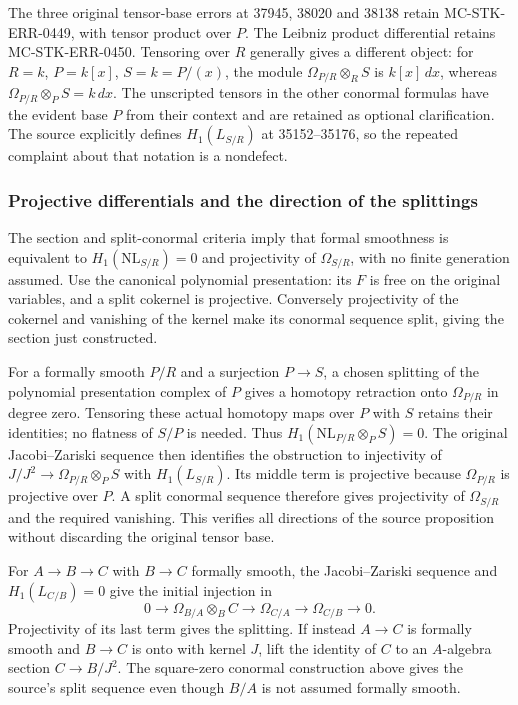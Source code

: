 The three original tensor-base errors at 37945, 38020 and 38138 retain MC-STK-ERR-0449, with tensor product over \(P\). The Leibniz product differential retains MC-STK-ERR-0450. Tensoring over \(R\) generally gives a different object: for \(R=k\), \(P=k[x]\), \(S=k=P/(x)\), the module \(\Omega_{P/R}\otimes_RS\) is \(k[x]\,dx\), whereas \(\Omega_{P/R}\otimes_PS=k\,dx\). The unscripted tensors in the other conormal formulas have the evident base \(P\) from their context and are retained as optional clarification. The source explicitly defines \(H_1(L_{S/R})\) at 35152--35176, so the repeated complaint about that notation is a nondefect.

\subsubsection{Projective differentials and the direction of the splittings}\label{algebra-proof-048-projective-differentials-and-the-direction-of-the-splittings}

The section and split-conormal criteria imply that formal smoothness is equivalent to \(H_1(\mathrm{NL}_{S/R})=0\) and projectivity of \(\Omega_{S/R}\), with no finite generation assumed. Use the canonical polynomial presentation: its \(F\) is free on the original variables, and a split cokernel is projective. Conversely projectivity of the cokernel and vanishing of the kernel make its conormal sequence split, giving the section just constructed.

For a formally smooth \(P/R\) and a surjection \(P\to S\), a chosen splitting of the polynomial presentation complex of \(P\) gives a homotopy retraction onto \(\Omega_{P/R}\) in degree zero. Tensoring these actual homotopy maps over \(P\) with \(S\) retains their identities; no flatness of \(S/P\) is needed. Thus \(H_1(\mathrm{NL}_{P/R}\otimes_PS)=0\). The original Jacobi--Zariski sequence then identifies the obstruction to injectivity of \(J/J^2\to\Omega_{P/R}\otimes_PS\) with \(H_1(L_{S/R})\). Its middle term is projective because \(\Omega_{P/R}\) is projective over \(P\). A split conormal sequence therefore gives projectivity of \(\Omega_{S/R}\) and the required vanishing. This verifies all directions of the source proposition without discarding the original tensor base.

For \(A\to B\to C\) with \(B\to C\) formally smooth, the Jacobi--Zariski sequence and \(H_1(L_{C/B})=0\) give the initial injection in \[
0\longrightarrow\Omega_{B/A}\otimes_BC\longrightarrow
\Omega_{C/A}\longrightarrow\Omega_{C/B}\longrightarrow0.
\] Projectivity of its last term gives the splitting. If instead \(A\to C\) is formally smooth and \(B\to C\) is onto with kernel \(J\), lift the identity of \(C\) to an \(A\)-algebra section \(C\to B/J^2\). The square-zero conormal construction above gives the source's split sequence even though \(B/A\) is not assumed formally smooth.

